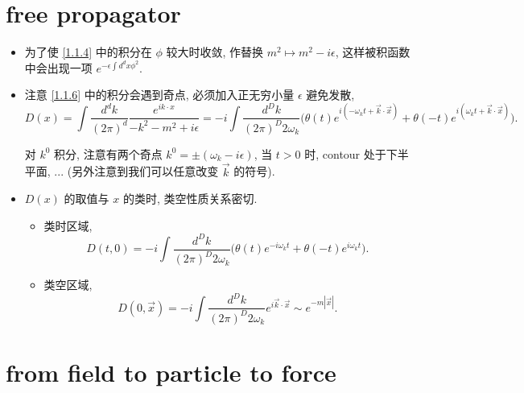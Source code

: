 \section{free propagator}
\begin{itemize}
	\item 为了使 \eqref{1.1.4} 中的积分在 $\phi$ 较大时收敛, 作替换 $m^2 \mapsto m^2 - i \epsilon$, 这样被积函数中会出现一项 $e^{- \epsilon \int d^d x \phi^2}$.
	
	\item 注意 \eqref{1.1.6} 中的积分会遇到奇点, 必须加入正无穷小量 $\epsilon$ 避免发散,
	\begin{equation} \label{1.2.1}
		D(x) = \int \frac{d^d k}{(2 \pi)^d} \frac{e^{i k \cdot x}}{- k^2 - m^2 + i \epsilon} = - i \int \frac{d^D k}{(2 \pi)^D 2 \omega_k} \Big( \theta(t) e^{i (- \omega_k t + \vec{k} \cdot \vec{x})} + \theta(- t) e^{i (\omega_k t + \vec{k} \cdot \vec{x})} \Big).
	\end{equation}
	
	\begin{tcolorbox}[title=calculation:]
		对 $k^0$ 积分, 注意有两个奇点 $k^0 = \pm (\omega_k - i \epsilon)$, 当 $t > 0$ 时, contour 处于下半平面, ... (另外注意到我们可以任意改变 $\vec{k}$ 的符号).
	\end{tcolorbox}
	
	\item $D(x)$ 的取值与 $x$ 的类时, 类空性质关系密切.
	\begin{itemize}
		\item 类时区域,
		\begin{equation}
			D(t, 0) = - i \int \frac{d^D k}{(2 \pi)^D 2 \omega_k} \Big( \theta(t) e^{- i \omega_k t} + \theta(- t) e^{i \omega_k t} \Big).
		\end{equation}
		
		\item 类空区域,
		\begin{equation}
			D(0, \vec{x}) = - i \int \frac{d^D k}{(2 \pi)^D 2 \omega_k} e^{i \vec{k} \cdot \vec{x}} \sim e^{- m |\vec{x}|}.
		\end{equation}
	\end{itemize}
\end{itemize}

\section{from field to particle to force}
